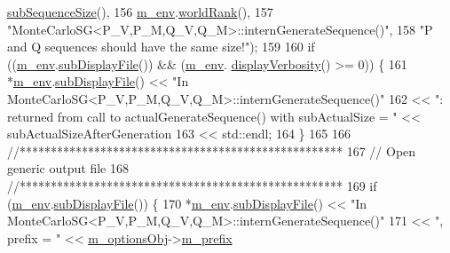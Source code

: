 \begin{DoxyCode}
      \hyperlink{class_q_u_e_s_o_1_1_base_vector_sequence_afd6278702d40bdf1044697bbd6ad1957}{subSequenceSize}(),
156                       \hyperlink{class_q_u_e_s_o_1_1_monte_carlo_s_g_a30055a359b22cde54681679aed8ae6e7}{m\_env}.\hyperlink{class_q_u_e_s_o_1_1_base_environment_a78b57112bbd0e6dd0e8afec00b40ffa7}{worldRank}(),
157                       \textcolor{stringliteral}{"MonteCarloSG<P\_V,P\_M,Q\_V,Q\_M>::internGenerateSequence()"},
158                       \textcolor{stringliteral}{"P and Q sequences should have the same size!"});
159 
160   \textcolor{keywordflow}{if} ((\hyperlink{class_q_u_e_s_o_1_1_monte_carlo_s_g_a30055a359b22cde54681679aed8ae6e7}{m\_env}.\hyperlink{class_q_u_e_s_o_1_1_base_environment_a8a0064746ae8dddfece4229b9ad374d6}{subDisplayFile}()) && (\hyperlink{class_q_u_e_s_o_1_1_monte_carlo_s_g_a30055a359b22cde54681679aed8ae6e7}{m\_env}.
      \hyperlink{class_q_u_e_s_o_1_1_base_environment_a1fe5f244fc0316a0ab3e37463f108b96}{displayVerbosity}() >= 0)) \{
161     *\hyperlink{class_q_u_e_s_o_1_1_monte_carlo_s_g_a30055a359b22cde54681679aed8ae6e7}{m\_env}.\hyperlink{class_q_u_e_s_o_1_1_base_environment_a8a0064746ae8dddfece4229b9ad374d6}{subDisplayFile}() << \textcolor{stringliteral}{"In
       MonteCarloSG<P\_V,P\_M,Q\_V,Q\_M>::internGenerateSequence()"}
162                             << \textcolor{stringliteral}{": returned from call to actualGenerateSequence() with subActualSize = "} << 
      subActualSizeAfterGeneration
163                             << std::endl;
164   \}
165 
166   \textcolor{comment}{//****************************************************}
167   \textcolor{comment}{// Open generic output file      }
168   \textcolor{comment}{//****************************************************}
169   \textcolor{keywordflow}{if} (\hyperlink{class_q_u_e_s_o_1_1_monte_carlo_s_g_a30055a359b22cde54681679aed8ae6e7}{m\_env}.\hyperlink{class_q_u_e_s_o_1_1_base_environment_a8a0064746ae8dddfece4229b9ad374d6}{subDisplayFile}()) \{
170     *\hyperlink{class_q_u_e_s_o_1_1_monte_carlo_s_g_a30055a359b22cde54681679aed8ae6e7}{m\_env}.\hyperlink{class_q_u_e_s_o_1_1_base_environment_a8a0064746ae8dddfece4229b9ad374d6}{subDisplayFile}() << \textcolor{stringliteral}{"In
       MonteCarloSG<P\_V,P\_M,Q\_V,Q\_M>::internGenerateSequence()"}
171                             << \textcolor{stringliteral}{", prefix = "}                                                        << 
      \hyperlink{class_q_u_e_s_o_1_1_monte_carlo_s_g_acf7ce935648fd3a5d0ee23685708b4ca}{m\_optionsObj}->\hyperlink{class_q_u_e_s_o_1_1_monte_carlo_s_g_options_ac640fa60af7134d4113e9b7481a34f6c}{m\_prefix}

\end{DoxyCode}
